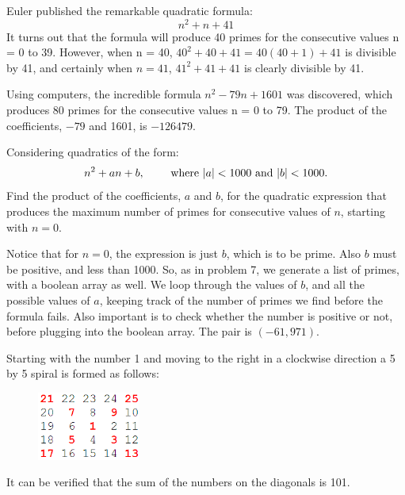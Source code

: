 


Euler published the remarkable quadratic formula:
$$n^2 + n + 41$$
It turns out that the formula will produce 40 primes for the consecutive values n = 0 to 39. However, when n = 40, $40^2 + 40 + 41 = 40(40 + 1) + 41$ is divisible by 41, and certainly when $n = 41$, $41^2 + 41 + 41$ is clearly divisible by 41.

Using computers, the incredible formula  $n^2 - 79n + 1601$ was discovered, which produces 80 primes for the consecutive values n = 0 to 79. The product of the coefficients, $-79$ and 1601, is $-126479$.

Considering quadratics of the form:
$$  n^2 + an + b, \qquad \hbox{ where }|a| < 1000 \hbox{ and }|b| < 1000.$$
Find the product of the coefficients, $a$ and $b$, for the quadratic expression that produces the maximum number of primes for consecutive values of $n$, starting with $n = 0$.

Notice that for $n=0$, the expression is just $b$, which is to be prime.  Also $b$ must be positive, and less than 1000.
So, as in problem 7, we generate a list of primes, with a boolean array as well.  We loop through the values of $b$, and
all the possible values of $a$, keeping track of the number of primes we find before the formula fails.  Also important is 
to check whether the number is positive or not, before plugging into the boolean array.  The pair is $(-61, 971)$.




Starting with the number 1 and moving to the right in a clockwise direction a 5 by 5 spiral is formed as follows:
\begin{center}
\begin{figure}[h]
\centering
\includegraphics[width = 0.3\textwidth]{./images/p_028.png}
\end{figure}
\end{center}
\vspace{-1cm}
It can be verified that the sum of the numbers on the diagonals is 101.

